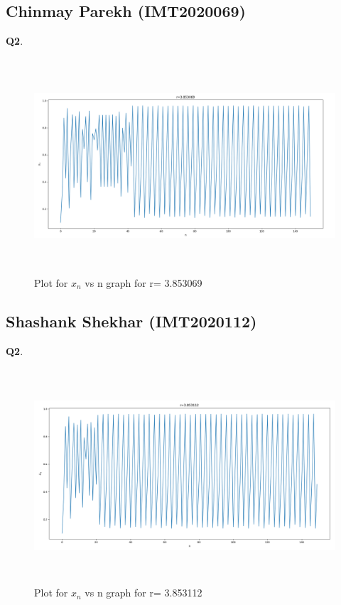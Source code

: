 \documentclass[11pt]{scrartcl} %
\begin{document}
\subsection{Chinmay Parekh (IMT2020069)}
\textbf{Q2}.
\begin{figure}[h] %
	\centering
	\includegraphics[width=12cm, height=8cm]{chinmay69.png} %
	\caption {Plot for $x_n$ vs n graph for r= 3.853069}
\end{figure}
\newpage
\subsection{Shashank Shekhar (IMT2020112)}
\textbf{Q2}.
\begin{figure}[h] %
	\centering
	\includegraphics[width=12cm, height=8cm]{shashank.png} %
	\caption {Plot for $x_n$ vs n graph for r= 3.853112}
\end{figure}
\end{document}
